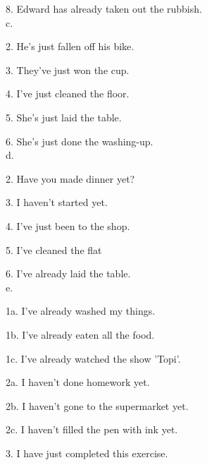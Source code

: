 \documentclass{article}
\begin{document}
8. Edward has already taken out the rubbish.
\\
c. 

2. He's just fallen off his bike.

3. They've just won the cup.

4. I've just cleaned the floor.

5. She's just laid the table.

6. She's just done the washing-up. 
\\
d. 

2. Have you made dinner yet?

3. I haven't started yet.

4. I've just been to the shop.

5. I've cleaned the flat

6. I've already laid the table.
\\
e.

1a. I've already washed my things.

1b. I've already eaten all the food.

1c. I've already watched the show 'Topi'. 

2a. I haven't done homework  yet.

2b. I haven't gone to the supermarket yet.

2c. I haven't filled the pen with ink yet.

3. I have just completed this exercise.
\end{document}
